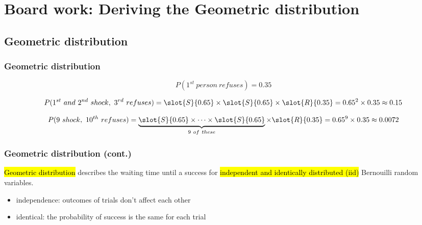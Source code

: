 \documentclass[slidestop,compress,mathserif]{beamer}
\newcommand{\soln}[1]{\textit{#1}}
\begin{document}

\section{Board work: Deriving the Geometric distribution}


\subsection{Geometric distribution}

\begin{frame}
\frametitle{Geometric distribution}

{\small


\[ P(1^{st}~person~refuses) = 0.35 \]

\pause

\[ P(1^{st}~and~2^{nd}~shock,~3^{rd}~refuses) = \slot{S}{0.65} \times \slot{S}{0.65} \times  \slot{R}{0.35} = 0.65^2 \times 0.35 \approx 0.15 \]

\pause

\soln{
\pause
\[ P(9~shock,~10^{th}~refuses) = \underbrace{\slot{S}{0.65} \times \cdots \times \slot{S}{0.65}}_{9~of~these} \times  \slot{R}{0.35} = 0.65^9 \times 0.35 \approx 0.0072 \]
}
}

\end{frame}


\begin{frame}
\frametitle{Geometric distribution (cont.)}

\hl{Geometric distribution} describes the waiting time until a success for \hl{independent and identically distributed (iid)} Bernouilli random variables.
\begin{itemize}
\item independence: outcomes of trials don't affect each other
\item identical: the probability of success is the same for each trial
\end{itemize}

$\:$ \\
$\:$ \\

\pause


\end{frame}
\end{document}
